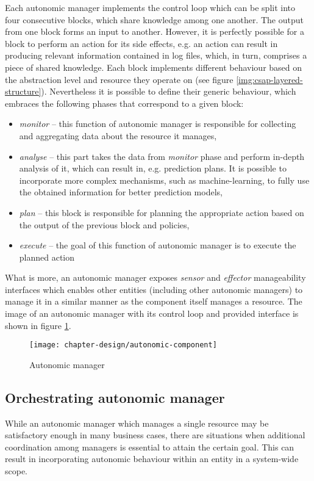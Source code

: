 Each autonomic manager implements the control loop which can be split into four consecutive blocks, which share knowledge among one another. The output from one block forms an input to another. However, it is perfectly possible for a block to perform an action for its side effects, e.g. an action can result in producing relevant information contained in log files, which, in turn, comprises a piece of shared knowledge. Each block implements different behaviour based on the abstraction level and resource they operate on (see figure \ref{img:csap-layered-structure}). Nevertheless it is possible to define their generic behaviour, which embraces the following phases that correspond to a given block:
\begin{itemize}
  \item \emph{monitor} -- this function of autonomic manager is responsible for collecting and aggregating data about the resource it manages,
  \item \emph{analyse} -- this part takes the data from \emph{monitor} phase and perform in-depth analysis of it, which can result in, e.g. prediction plans. It is possible to incorporate more complex mechanisms, such as machine-learning, to fully use the obtained information for better prediction models,
  \item \emph{plan} -- this block is responsible for planning the appropriate action based on the output of the previous block and policies,
  \item \emph{execute} -- the goal of this function of autonomic manager is to execute the planned action
\end{itemize}
What is more, an autonomic manager exposes \emph{sensor} and \emph{effector} manageability interfaces which enables other entities (including other autonomic managers) to manage it in a similar manner as the component itself manages a resource. The image of an autonomic manager with its control loop and provided interface is shown in figure \ref{img:autonomic-component}.

\begin{figure}[!ht]
  \begin{center}
    \texttt{[image: chapter-design/autonomic-component]}
  \end{center}
  \caption{Autonomic manager}
  \label{img:autonomic-component}
\end{figure}

\subsection{Orchestrating autonomic manager}
While an autonomic manager which manages a single resource may be satisfactory enough in many business cases, there are situations when additional coordination among managers is essential to attain the certain goal. This can result in incorporating autonomic behaviour within an entity in a system-wide scope.

